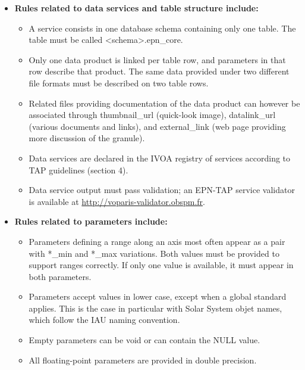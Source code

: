 \documentclass[11pt,a4paper]{ivoa}
\begin{document}
\begin{itemize}
\item \textbf{Rules related to data services and table structure include:}

\begin{itemize}
\item 
A service consists in one database schema containing only one table. The table must be called <schema>.epn\_core. 

\item Only one data product is linked per table row, and parameters in that row describe that product. The same data provided under two different file formats must be described on two table rows.

\item Related files providing documentation of the data product can however be associated through thumbnail\_{url} (quick-look image), datalink\_url (various documents and links), and external\_link (web page providing more discussion of the granule).

\item Data services are declared in the IVOA registry of services according to TAP guidelines (section 4).

\item Data service output must pass validation; an EPN-TAP service
validator is available at \url{http://voparis-validator.obspm.fr}.
\end{itemize}


\item \textbf{Rules related to parameters include:}

\begin{itemize}
\item Parameters defining a range along an axis most often appear as a pair with *\_min and *\_max variations.
Both values must be provided to support ranges correctly. If only one value is available, it must appear in both parameters.


\item Parameters accept values in lower case, except when a global standard applies. This is the case in particular with Solar System objet names, which follow the IAU naming convention. 

\item Empty parameters can be void or can contain the NULL value. 

\item All floating-point parameters are provided in double precision.


\end{itemize}
\end{itemize}
\end{document}

